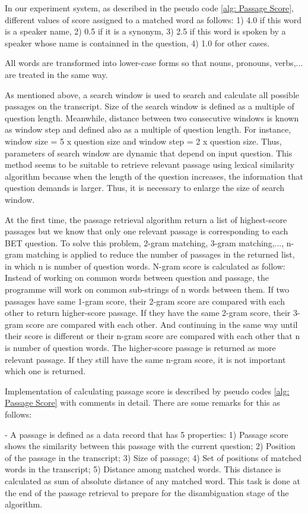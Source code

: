 \documentclass[10pt,a4paper]{article}
\numberwithin{algorithm}{section}  %
\begin{document}
In our experiment system, as described in the pseudo code \ref{alg: Passage Score}, different values of score assigned to a matched word as follows: 1) 4.0 if this word is a speaker name, 2) 0.5 if it is a synonym, 3) 2.5 if this word is spoken by a speaker whose name is containned in the question, 4) 1.0 for other cases.

All words are transformed into lower-case forms so that nouns, pronouns, verbs,... are treated in the same way. 

As mentioned above, a search window is used to search and calculate all possible passages on the transcript. Size of the search window is defined as a multiple of question length. Meanwhile, distance between two consecutive windows is known as window step and defined also as a multiple of question length. For instance, window size = 5 x question size and window step = 2 x question size. Thus, parameters of search window are dynamic that depend on input question. This method seems to be suitable to retrieve relevant passage using lexical similarity algorithm because when the length of the question increases, the information that question demands is larger. Thus, it is necessary to enlarge the size of search window.

At the first time, the passage retrieval algorithm return a list of highest-score passages but we know that only one relevant passage is corresponding to each BET question. To solve this problem, 2-gram matching, 3-gram matching,..., n-gram matching is applied to reduce the number of passages in the returned list, in which n is number of question words. N-gram score is calculated as follow: Instead of working on common words between question and passage, the programme will work on common sub-strings of n words between them. If two passages have same 1-gram score, their 2-gram score are compared with each other to return higher-score passage. If they have the same 2-gram score, their 3-gram score are compared with each other. And continuing in the same way until their score is different or their n-gram score are compared with each other that n is number of question words. The higher-score passage is returned as more relevant passage. If they still have the same n-gram score, it is not important which one is returned.


Implementation of calculating passage score is described by pseudo codes \ref{alg: Passage Score} with comments in detail. There are some remarks for this as follows:

- A passage is defined as a data record that has 5 properties: 1) Passage score shows the similarity between this passage with the current question; 2) Position of the passage in the transcript; 3) Size of passage; 4) Set of positions of matched words in the transcript; 5) Distance among matched words. This distance is calculated as sum of absolute distance of any matched word. This task is done at the end of the passage retrieval to prepare for the disambiguation stage of the algorithm.
\end{document}
